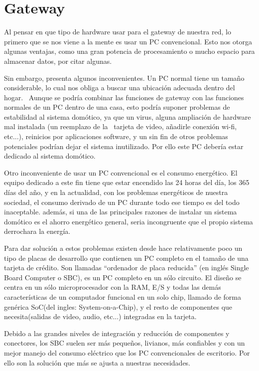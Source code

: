 \section{Gateway}
Al pensar en que tipo de hardware usar para el gateway de nuestra red, lo primero que se nos viene a la mente es usar un PC convencional. Esto nos otorga algunas ventajas, como una gran potencia de procesamiento o mucho espacio para almacenar datos, por citar algunas. 



Sin embargo, presenta algunos inconvenientes. Un PC normal tiene un tamaño considerable, lo cual nos obliga a buscar una ubicación adecuada dentro del hogar. \ Aunque se podría combinar las funciones de gateway con las funciones normales de un PC dentro de una casa, esto podría suponer problemas de estabilidad al sistema domótico, ya que un virus, alguna ampliación de hardware mal instalada (un reemplazo de la \ tarjeta de video, añadirle conexión wi-fi, etc...), reinicios por aplicaciones software, y un sin fin de otros problemas potenciales podrían dejar el sistema inutilizado. Por ello este PC debería estar dedicado al sistema domótico.



Otro inconveniente de usar un PC convencional es el consumo energético. El equipo dedicado a este fin tiene que estar encendido las 24 horas del día, los 365 días del año, y en la actualidad, con los problemas energéticos de nuestra sociedad, el consumo derivado de un PC durante todo ese tiempo es del todo inaceptable. además, si una de las principales razones de instalar un sistema domótico es el ahorro energético general, seria incongruente que el propio sistema derrochara la energía.



Para dar solución a estos problemas existen desde hace relativamente poco un tipo de placas de desarrollo que contienen un PC completo en el tamaño de una tarjeta de crédito. Son llamadas “ordenador de placa reducida” (en inglés Single Board Computer o SBC), es un PC completo en un sólo circuito. El diseño se centra en un sólo microprocesador con la RAM, E/S y todas las demás características de un computador funcional en un solo chip, llamado de forma genérica SoC(del ingles: System-on-a-Chip), y el resto de componentes que necesita(salidas de video, audio, etc...) integradas en la tarjeta.



Debido a las grandes niveles de integración y reducción de componentes y conectores, los SBC suelen ser más pequeños, livianos, más confiables y con un mejor manejo del consumo eléctrico que los PC convencionales de escritorio. Por ello son la solución que más se ajusta a nuestras necesidades.



